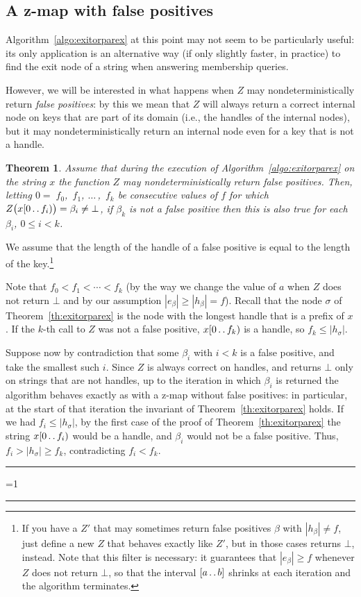 \documentclass[a4paper]{article}
\newcounter{noqed}
\newcommand{\qed}{ \ifmmode\mbox{
}\fi\rule[-.05em]{.3em}{.7em}\setcounter{noqed}{0}}
\newenvironment{proof}[1][{}]{\noindent{\bf Proof#1.
}\setcounter{noqed}{1}}{\ifnum\value{noqed}=1\qed\fi\par\medskip}
\newtheorem{theorem}{Theorem}
\newcommand{\?}{\mskip1.5mu}
\newcommand{\lst}[2]{${#1}_0$,~${#1}_1$, $\dots\,$,~${#1}_{#2}$}
\def\..{\,\mathpunct{\ldotp\ldotp}} %
\begin{document}
\subsection{A z-map with false positives}

Algorithm~\ref{algo:exitorparex} at this point may not seem to be particularly useful: its
only application is an alternative way (if only slightly faster, in practice) to find the exit node of a
string when answering membership queries.

However, we will be interested in what happens when $Z$ may nondeterministically
return \emph{false positives}: by this we mean that $Z$ will always return a
correct internal node on keys that are part of its domain (i.e., the handles of
the internal nodes), but it may nondeterministically return an internal node
even for a key that is not a handle.

\begin{theorem}
\label{th:errors}
Assume that during the execution of Algorithm~\ref{algo:exitorparex} on the string $x$ the
function $Z$ may nondeterministically return false positives.
Then, letting $0=\;$\lst fk be consecutive values of $f$ for which
$Z\bigl(x[0\..f_i)\bigr)=\beta_i\neq\bot$, if $\beta_k$ 
is not a false positive then this is also true for each $\beta_i$, $0\leq i<k$.
\end{theorem}
\begin{proof}
We assume that the length of the handle of a false positive
is equal to the length of the key.\footnote{If you have a $Z'$ that may sometimes return false positives $\beta$ with
$|h_\beta|\neq f$, just define a new $Z$ that behaves exactly like $Z'$, but in those cases returns $\bot$, instead.
Note that this filter is necessary: it guarantees that $|e_\beta|\geq f$ whenever $Z$ does not return $\bot$, so that
the interval $[a\..b]$ shrinks at each iteration and the algorithm terminates.} 

Note that $f_0<f_1<\cdots<f_k$ (by the way we change the value of $a$ when $Z$ does not return $\bot$
and by our assumption $|e_\beta|\geq |h_\beta|=f$). Recall that the node $\sigma$ of Theorem~\ref{th:exitorparex}
is the node with the longest handle that is a prefix of $x$.
If the $k$-th call to $Z$ was not a false positive, $x[0\..f_k)$ is a handle, so
$f_k\leq|h_\sigma|$.

Suppose now by contradiction that some $\beta_i$ with $i<k$ is a false positive, and take the smallest such $i$.
Since $Z$ is always correct on handles, and returns $\bot$ only on strings that are not handles, 
up to the iteration in which $\beta_i$ is returned the algorithm behaves exactly as with a z-map without false positives:
in particular, at the start of that iteration the invariant of Theorem~\ref{th:exitorparex} holds.
If we had $f_i\leq|h_\sigma|$, by the first case of 
the proof of Theorem~\ref{th:exitorparex} the string $x[0\..f_i)$ would be a handle, and $\beta_i$ would not be 
a false positive. Thus, $f_i>|h_\sigma|\geq f_k$, contradicting $f_i<f_k$.\qed
\end{proof}
\end{document}
